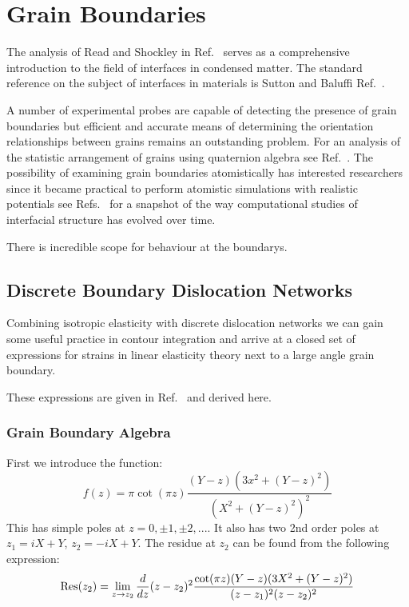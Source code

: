 \section{Grain Boundaries}
The analysis of Read and Shockley in Ref.~\cite{read50} serves as a comprehensive
introduction to the field of interfaces in condensed matter. The 
standard reference on the subject of interfaces in materials is Sutton and 
Baluffi Ref.~\cite{sutton95}.

A number of experimental probes are capable of detecting the presence of 
grain boundaries but efficient and accurate means of determining 
the orientation relationships between grains remains an outstanding problem.
For an analysis of the statistic arrangement of grains using quaternion
algebra see Ref.~\cite{sutton96}.
The possibility of examining grain boundaries atomistically has interested
researchers since it became practical to perform atomistic simulations
with realistic potentials see Refs.~\cite{bristowe75,wolf83,paxton87,paxton88,paxtonsutton88,
kohyama88,kohyama94,paxton96,rittner96,tschopp07,momida13,du11,du12,mceniry18} for a
snapshot of the way computational studies of interfacial structure 
has evolved over time.

There is incredible scope for behaviour at the boundarys.

\subsection{Discrete Boundary Dislocation Networks}
Combining isotropic elasticity with discrete dislocation networks
we can gain some useful practice in contour integration and arrive
at a closed set of expressions for strains in linear elasticity
theory next to a large angle grain boundary. 

These expressions are given in Ref.~\cite{sutton95} and derived here.

\subsubsection{Grain Boundary Algebra}
\label{gbalgebra}
First we introduce the function:
%
\begin{equation}
f(z) =  \pi\cot(\pi z)\frac{(Y-z)(3x^{2} + (Y-z)^{2})}{(X^{2} + (Y-z)^{2})^{2}}
\end{equation}
%
This has simple poles at $z = 0, \pm 1, \pm 2,...$. It also has two 2nd 
order poles at  $z_{1}=iX+Y$, $z_{2}=-iX+Y$. The residue at $z_{2}$ can
be found from the following expression: 
%
\begin{equation}
{\rm Res}(z_{2}) = \lim_{z\rightarrow z_{2}}\frac{d}{dz}(z-z_{2})^{2}
\frac{\cot(\pi z)(Y-z)(3X^{2}+(Y-z)^2)}{(z-z_{1})^{2}(z-z_{2})^{2}}
\end{equation}


